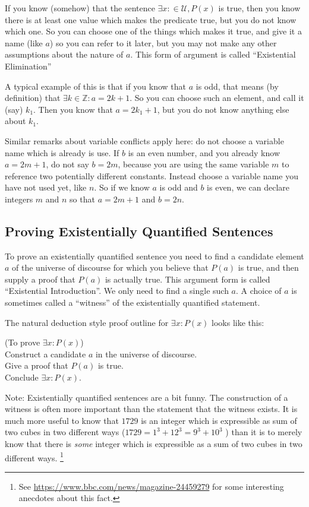 If you know (somehow) that the sentence $\exists x : \in \mathcal{U}, P(x)$ is true, then you know there is at least one value which makes the predicate true, but you do not know which one.  So you can choose one of the things which makes it true, and give it a name (like $a$) so you can refer to it later, but you may not make any other assumptions about the nature of $a$.  This form of argument is called ``Existential Elimination''

A typical example of this is that if you know that $a$ is odd, that means (by definition) that $\exists k \in \mathbb{Z}: a=2k+1$.  So you can choose such an element, and call it (say) $k_1$.  Then you know that $a=2k_1+1$, but you do not know anything else about $k_1$.  

Similar remarks about variable conflicts apply here:  do not choose a variable name which is already is use.  If $b$ is an even number, and you already know $a=2m+1$, do not say $b = 2m$, because you are using the same variable $m$ to reference two potentially different constants.  Instead choose a variable name you have not used yet, like $n$.  So if we know $a$ is odd and $b$ is even, we can declare integers $m$ and $n$ so that $a=2m+1$ and $b = 2n$.

\subsection{Proving Existentially Quantified Sentences}

To prove an existentially quantified sentence you need to find a candidate element $a$ of the universe of discourse for which you believe that $P(a)$ is true, and then supply a proof that $P(a)$ is actually true.  This argument form is called ``Existential Introduction''.  We only need to find a single such $a$.  A choice of $a$ is sometimes called a ``witness'' of the existentially quantified statement.

The natural deduction style proof outline for $\exists x:  P(x)$ looks like this:

\begin{fitch*}
	\textrm{(To prove $\exists x: P(x)$)}\\
	\textrm{Construct a candidate $a$ in the universe of discourse.}\\
	\textrm{Give a proof that $P(a)$ is true.}\\
	\textrm{Conclude $\exists x: P(x)$.}
\end{fitch*} 

Note:  Existentially quantified sentences are a bit funny.  The construction of a witness is often more important than the statement that the witness exists.  It is much more useful to know that $1729$ is an integer which is expressible as sum of two cubes in two different ways ($1729 = 1^3+12^3 = 9^3+10^3$ ) than it is to merely know that there is \textit{some} integer which is expressible as a sum of two cubes in two different ways. \footnote{ See \url{https://www.bbc.com/news/magazine-24459279} for some interesting anecdotes about this fact.}

